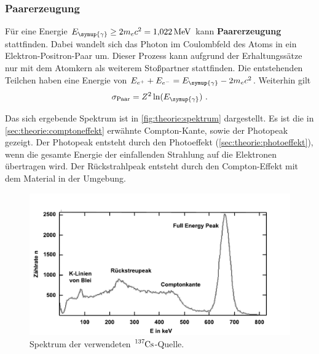     \subsubsection*{Paarerzeugung} \label{sec:theorie:paarerzeugung}
    Für eine Energie $E_{\symup{\gamma}} \geq 2m_{e}c^2 = \SI{1.022}{\mega\eV}$ kann \textbf{Paarerzeugung} stattfinden.
    Dabei wandelt sich das Photon im Coulombfeld des Atoms in ein Elektron-Positron-Paar um.
    Dieser Prozess kann aufgrund der Erhaltungssätze nur mit dem Atomkern als weiterem Stoßpartner stattfinden.
    Die entstehenden Teilchen haben eine Energie von $E_{e^{+}} + E_{e^{-}} = E_{\symup{\gamma}} - 2m_{e}c^2$.
    Weiterhin gilt
    \begin{equation*}
        \sigma_\text{Paar} = Z^2 \ln(E_{\symup{\gamma}}) \ .
    \end{equation*}


    Das sich ergebende Spektrum ist in \autoref{fig:theorie:spektrum} dargestellt.
    Es ist die in \autoref{sec:theorie:comptoneffekt} erwähnte Compton-Kante,
    sowie der Photopeak gezeigt.
    Der Photopeak entsteht durch den Photoeffekt (\autoref{sec:theorie:photoeffekt}),
    wenn die gesamte Energie der einfallenden Strahlung auf die Elektronen übertragen wird.
    Der Rückstrahlpeak entsteht durch den Compton-Effekt mit dem Material in der Umgebung.

    \begin{figure}
       \centering
       \includegraphics[width=\textwidth]{content/img/cs137-spektrum_Leifi.pdf}
       \caption{Spektrum der verwendeten $\ce{^{137}Cs}$-Quelle. \cite{caesium}}
       \label{fig:theorie:spektrum}
    \end{figure}

